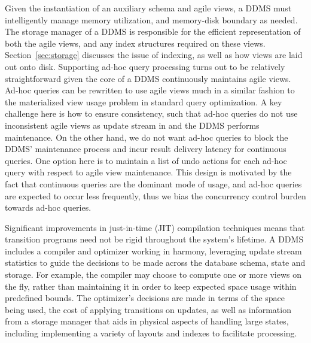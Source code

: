 Given the instantiation of an auxiliary schema and agile views, a DDMS must
intelligently manage memory utilization, and memory-disk boundary as needed. The
storage manager of a DDMS is responsible for the efficient representation of
both the agile views, and any index structures required on these views.
Section~\ref{sec:storage} discusses the issue of indexing, as well as how views
are laid out onto disk. Supporting ad-hoc query processing turns out to be
relatively straightforward given the core of a DDMS continuously maintains agile
views. Ad-hoc queries can be rewritten to use agile views much in a similar
fashion to the materialized view usage problem in standard query optimization. A
key challenge here is how to ensure consistency, such that ad-hoc queries do not
use inconsistent agile views as update stream in and the DDMS performs
maintenance. On the other hand, we do not want ad-hoc queries to block the DDMS'
maintenance process and incur result delivery latency for continuous queries.
One option here is to maintain a list of undo actions for each ad-hoc query with
respect to agile view maintenance. This design is motivated by the fact that
continuous queries are the dominant mode of usage, and ad-hoc queries are
expected to occur less frequently, thus we bias the concurrency control burden
towards ad-hoc queries.






Significant improvements in just-in-time (JIT) compilation techniques means that
transition programs need not be rigid throughout the system's lifetime. A DDMS
includes a compiler and optimizer working in harmony, leveraging update stream
statistics to guide the decisions to be made across the database schema, state
and storage. For example, the compiler may choose to compute one or more views
on the fly, rather than maintaining it in order to keep expected space usage
within predefined bounds. The optimizer's decisions are made in terms of the
space being used, the cost of applying transitions on updates, as well as
information from a storage manager that aids in physical aspects of handling
large states, including implementing a variety of layouts and indexes to
facilitate processing.










